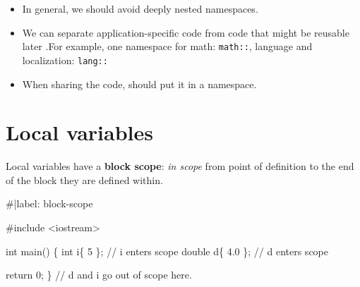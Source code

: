 \documentclass[
  letterpaper,
  DIV=11,
  numbers=noendperiod]{scrreprt}
\newenvironment{Shaded}{\begin{snugshade}}{\end{snugshade}}
\newcommand{\CommentTok}[1]{\textcolor[rgb]{0.37,0.37,0.37}{#1}}
\newcommand{\DecValTok}[1]{\textcolor[rgb]{0.68,0.00,0.00}{#1}}
\newcommand{\ErrorTok}[1]{\textcolor[rgb]{0.68,0.00,0.00}{#1}}
\newcommand{\FloatTok}[1]{\textcolor[rgb]{0.68,0.00,0.00}{#1}}
\newcommand{\FunctionTok}[1]{\textcolor[rgb]{0.28,0.35,0.67}{#1}}
\newcommand{\NormalTok}[1]{\textcolor[rgb]{0.00,0.23,0.31}{#1}}
\newcommand{\SpecialCharTok}[1]{\textcolor[rgb]{0.37,0.37,0.37}{#1}}
\begin{document}
\begin{tcolorbox}[enhanced jigsaw, toprule=.15mm, rightrule=.15mm, opacityback=0, breakable, leftrule=.75mm, colback=white, colframe=quarto-callout-note-color-frame, arc=.35mm, left=2mm, bottomrule=.15mm]
\begin{minipage}[t]{5.5mm}
\textcolor{quarto-callout-note-color}{\faInfo}
\end{minipage}%
\begin{minipage}[t]{\textwidth - 5.5mm}

\begin{itemize}
\item
  In general, we should avoid deeply nested namespaces.
\item
  We can separate application-specific code from code that might be
  reusable later .For example, one namespace for math: \texttt{math::},
  language and localization: \texttt{lang::}
\item
  When sharing the code, should put it in a namespace.
\end{itemize}

\end{minipage}%
\end{tcolorbox}

\hypertarget{local-variables}{%
\section{Local variables}\label{local-variables}}

Local variables have a \textbf{block scope}: \emph{in scope} from point
of definition to the end of the block they are defined within.

\begin{Shaded}
\begin{Highlighting}[]
\CommentTok{\#|label: block{-}scope}

\CommentTok{\#include \textless{}iostream\textgreater{}}

\NormalTok{int }\FunctionTok{main}\NormalTok{()}
\NormalTok{\{}
\NormalTok{    int i\{ }\DecValTok{5}\NormalTok{ \};         }\SpecialCharTok{/}\ErrorTok{/}\NormalTok{ i enters scope}
\NormalTok{    double d\{ }\FloatTok{4.0}\NormalTok{ \};   }\SpecialCharTok{/}\ErrorTok{/}\NormalTok{ d enters scope}

\NormalTok{    return }\DecValTok{0}\NormalTok{;}
\NormalTok{\}   }\SpecialCharTok{/}\ErrorTok{/}\NormalTok{ d and i go out of scope here.}
\end{Highlighting}
\end{Shaded}
\end{document}
